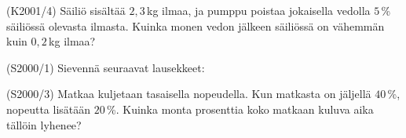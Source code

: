 \begin{multicols}{2}
\begin{tehtava}(K2001/4) Säiliö sisältää $2,3$\,kg ilmaa, ja pumppu poistaa jokaisella vedolla $5$\,\% säiliössä olevasta ilmasta. Kuinka monen vedon jälkeen säiliössä on vähemmän kuin $0,2$\,kg ilmaa?
\end{tehtava}

\begin{tehtava}(S2000/1) Sievennä seuraavat lausekkeet:
\end{tehtava}

\begin{tehtava}(S2000/3) Matkaa kuljetaan tasaisella nopeudella. Kun matkasta on jäljellä $40$\,\%, nopeutta lisätään $20$\,\%. Kuinka monta prosenttia koko matkaan kuluva aika tällöin lyhenee?
\end{tehtava}

\end{multicols}
\newpage